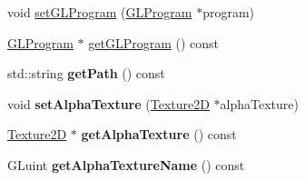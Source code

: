 \begin{DoxyCompactItemize}
\item 
void \hyperlink{classTexture2D_ab1e3f2bdc255d893dfc6ad541ceb29c0}{set\+G\+L\+Program} (\hyperlink{classGLProgram}{G\+L\+Program} $\ast$program)
\item 
\hyperlink{classGLProgram}{G\+L\+Program} $\ast$ \hyperlink{classTexture2D_ad1f4b0143dc648e4d41ee5e1969b96ea}{get\+G\+L\+Program} () const
\item 
\mbox{\label{classTexture2D_a0fece49baa70c5257db2e9ddf88b8fcd}} 
std\+::string {\bfseries get\+Path} () const
\item 
\mbox{\label{classTexture2D_a40d47bff7f05c1ef11a7a6a40ad0578c}} 
void {\bfseries set\+Alpha\+Texture} (\hyperlink{classTexture2D}{Texture2D} $\ast$alpha\+Texture)
\item 
\mbox{\label{classTexture2D_a99343b2d121d1baf40b93336caf2fdf9}} 
\hyperlink{classTexture2D}{Texture2D} $\ast$ {\bfseries get\+Alpha\+Texture} () const
\item 
\mbox{\label{classTexture2D_adccfd52496163de8b3e62e7ed041ae60}} 
G\+Luint {\bfseries get\+Alpha\+Texture\+Name} () const
\end{DoxyCompactItemize}
